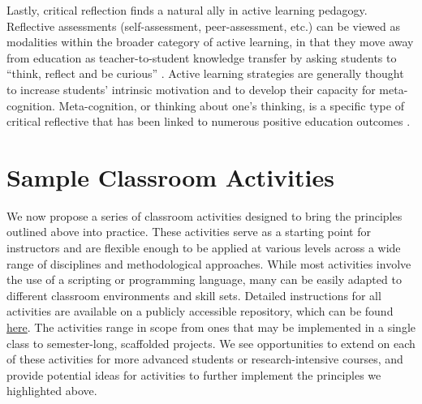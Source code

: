 \documentclass[
  12pt]{article}
\begin{document}
Lastly, critical reflection finds a natural ally in active learning pedagogy. 
Reflective assessments (self-assessment, peer-assessment, etc.) can be viewed as modalities within the broader category of active learning, in that they move away from education as teacher-to-student knowledge transfer by asking students to ``think, reflect and be curious'' \citep{tuta:2022}. 
Active learning strategies are generally thought to increase students' intrinsic motivation and to develop their capacity for meta-cognition.
Meta-cognition, or thinking about one's thinking, is a specific type of critical reflective that has been linked to numerous positive education outcomes \citep{dign:2008,fleu:2021}.



\section{Sample Classroom Activities} \label{sec-activities}

We now propose a series of classroom activities designed to bring the principles outlined above into practice.
These activities serve as a starting point for instructors and are flexible enough to be applied at various levels across a wide range of disciplines and methodological approaches.
While most activities involve the use of a scripting or programming language, many can be easily adapted to different classroom environments and skill sets.
Detailed instructions for all activities are available on a publicly accessible repository, which can be found \href{https://github.com/lacombe129/R_R_vignettes}{here}. The activities range in scope from ones that may be implemented in a single class to semester-long, scaffolded projects. We see opportunities to extend on each of these activities for more advanced students or research-intensive courses, and provide potential ideas for activities to further implement the principles we highlighted above. 
\end{document}
